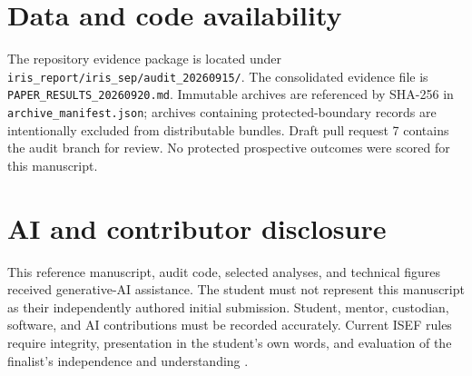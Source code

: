 \documentclass[11pt]{article}
\begin{document}
\section*{Data and code availability}

The repository evidence package is located under \texttt{iris\_report/iris\_sep/audit\_20260915/}. The consolidated evidence file is \texttt{PAPER\_RESULTS\_20260920.md}. Immutable archives are referenced by SHA-256 in \texttt{archive\_manifest.json}; archives containing protected-boundary records are intentionally excluded from distributable bundles. Draft pull request 7 contains the audit branch for review. No protected prospective outcomes were scored for this manuscript.

\section*{AI and contributor disclosure}

This reference manuscript, audit code, selected analyses, and technical figures received generative-AI assistance. The student must not represent this manuscript as their independently authored initial submission. Student, mentor, custodian, software, and AI contributions must be recorded accurately. Current ISEF rules require integrity, presentation in the student's own words, and evaluation of the finalist's independence and understanding \cite{isefrules2026,isefcriteria2026}.
\end{document}
